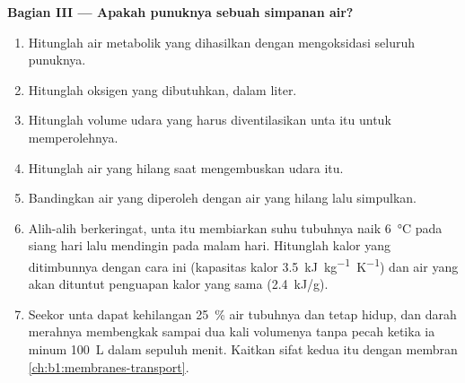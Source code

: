 \begin{problem}
\medskip
\noindent\textbf{Bagian III --- Apakah punuknya sebuah simpanan air?}
\begin{enumerate}[resume]
  \item Hitunglah air metabolik yang dihasilkan dengan mengoksidasi
        seluruh punuknya.
  \item Hitunglah oksigen yang dibutuhkan, dalam liter.
  \item Hitunglah volume udara yang harus diventilasikan unta itu untuk
        memperolehnya.
  \item Hitunglah air yang hilang saat mengembuskan udara itu.
  \item Bandingkan air yang diperoleh dengan air yang hilang lalu
        simpulkan.
  \item Alih-alih berkeringat, unta itu membiarkan suhu tubuhnya naik
        \qty{6}{\celsius} pada siang hari lalu mendingin pada malam
        hari. Hitunglah kalor yang ditimbunnya dengan cara ini
        (kapasitas kalor \qty{3.5}{kJ.kg^{-1}.K^{-1}}) dan air yang akan
        dituntut penguapan kalor yang sama (\qty{2.4}{kJ/g}).
  \item Seekor unta dapat kehilangan \qty{25}{\%} air tubuhnya dan tetap
        hidup, dan  darah merahnya membengkak sampai dua kali
        volumenya tanpa pecah ketika ia minum \qty{100}{L} dalam sepuluh
        menit. Kaitkan sifat kedua itu dengan membran
        \cref{ch:b1:membranes-transport}.
\end{enumerate}


\end{problem}
